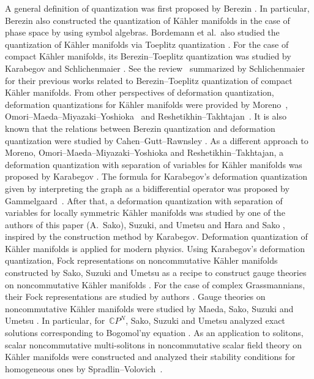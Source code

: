 \documentclass[10pt,a4paper]{amsart}
\numberwithin{equation}{section}
\begin{document}
A general definition of quantization was first proposed by Berezin \cite{Bere1,Bere2}. In particular, Berezin also constructed the quantization of K\"ahler manifolds in the case of phase space by using symbol algebras. Bordemann et al.\ also studied the quantization of K\"ahler manifolds via Toeplitz quantization \cite{BMS}. For the case of compact K\"ahler manifolds, its Berezin--Toeplitz quantization was studied by Karabegov and Schlichenmaier \cite{KS1,Schli1,Schli3,Schli2,Schli4,Schli5}. See the review~\cite{Schli6,Schli7} summarized by Schlichenmaier for their previous works related to Berezin--Toeplitz quantization of compact K\"ahler manifolds. From other perspectives of deformation quantization, deformation quantizations for K\"ahler manifolds were provided by Moreno~\cite{Mor1,Mor2}, Omori--Maeda--Miyazaki--Yoshioka~\cite{OMMY} and Reshetikhin--Takhtajan~\cite{RT}. It is also known that the relations between Berezin quantization and deformation quantization were studied by Cahen--Gutt--Rawnsley \cite{CGR1,CGR2,CGR3,CGR4}. As a different approach to Moreno, Omori--Maeda--Miyazaki--Yoshioka and Reshetikhin--Takhtajan, a deformation quantization with separation of variables for K\"ahler manifolds was proposed by Karabegov \cite{Kara2,Kara1}. The formula for Karabegov's deformation quantization given by interpreting the graph as a bidifferential operator was proposed by Gammelgaard~\cite{Gam}. After that, a deformation quantization with separation of variables for locally symmetric K\"ahler manifolds was studied by one of the authors of this paper (A.~Sako), Suzuki, and Umetsu \cite{SSU1,SSU2} and Hara and Sako \cite{HS1,HS2}, inspired by the construction method by Karabegov. Deformation quantization of K\"ahler manifolds is applied for modern physics. Using Karabegov's deformation quantization, Fock representations on noncommutative K\"ahler manifolds constructed by Sako, Suzuki and Umetsu as a recipe to construct gauge theories on noncommutative K\"ahler manifolds \cite{SSU1,SSU2,SU1,SU2,SU3}. For the case of complex Grassmannians, their Fock representations are studied by authors \cite{OS_Gpq_F}. Gauge theories on noncommutative K\"ahler manifolds were studied by Maeda, Sako, Suzuki and Umetsu \cite{MSSU,Sako}. In particular, for~$\mathbb{C}P^{N}$, Sako, Suzuki and Umetsu analyzed exact solutions corresponding to Bogomol'ny equation \cite{SSU3}. As an application to solitons, scalar noncommutative multi-solitons in noncommutative scalar field theory on K\"ahler manifolds were constructed and analyzed their stability conditions for homogeneous ones by Spradlin--Volovich~\cite{SV}.
\end{document}
